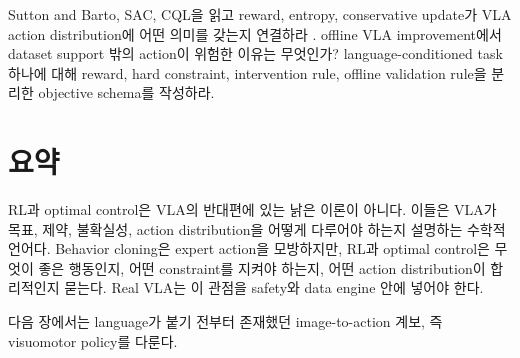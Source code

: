 \chapterwork
{Sutton and Barto, SAC, CQL을 읽고 reward, entropy, conservative update가 VLA action distribution에 어떤 의미를 갖는지 연결하라 \cite{sutton2018,haarnoja2018sac,kumar2020cql}.}
{offline VLA improvement에서 dataset support 밖의 action이 위험한 이유는 무엇인가?}
{language-conditioned task 하나에 대해 reward, hard constraint, intervention rule, offline validation rule을 분리한 objective schema를 작성하라.}

\section{요약}

RL과 optimal control은 VLA의 반대편에 있는 낡은 이론이 아니다. 이들은 VLA가 목표, 제약, 불확실성, action distribution을 어떻게 다루어야 하는지 설명하는 수학적 언어다. Behavior cloning은 expert action을 모방하지만, RL과 optimal control은 무엇이 좋은 행동인지, 어떤 constraint를 지켜야 하는지, 어떤 action distribution이 합리적인지 묻는다. Real VLA는 이 관점을 safety와 data engine 안에 넣어야 한다.

다음 장에서는 language가 붙기 전부터 존재했던 image-to-action 계보, 즉 visuomotor policy를 다룬다.
